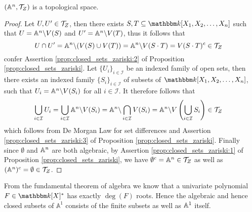 \begin{corollary}
  $(\mathbb{A}^{n}, \mathcal{T}_Z)$ is a topological space.
\end{corollary}
\begin{proof}
  Let $U, U' \in \mathcal{T}_Z$, then there exists $S, T \subseteq \pols$ such that $U = \mathbb{A}^{n} \backslash V(S)$ and $U' = \mathbb{A}^n \backslash V(T)$, thus it follows that
  \begin{equation*}
    U \cap U' = \mathbb{A}^{n} \backslash (V(S) \cup V(T)) = \mathbb{A}^{n} \backslash V(S \cdot T) = V(S \cdot T)^{c} \in \mathcal{T}_Z
  \end{equation*}
  confer Assertion \ref{prop:closed_sets_zariski:2} of Proposition \ref{prop:closed_sets_zariski}. Let $\{U_{i}\}_{i \in \mathcal{I}}$ be an indexed family of open sets, then there exists an indexed family $\{S_{i}\}_{i \in \mathcal{I}}$ of subsets of $\K[X_1, X_2, \ldots, X_{n}]$, such that $U_{i} = \mathbb{A}^{n} \backslash V(S_{i})$ for all $i \in \mathcal{I}$. It therefore follows that
  \begin{equation*}
    \bigcup_{i \in \mathcal{I}} U_{i} = \bigcup_{i \in \mathcal{I}} \mathbb{A}^{n} \backslash V(S_{i}) = \mathbb{A}^{n} \backslash \bigcap_{i \in \mathcal{I}} V(S_{i}) = \mathbb{A}^{n} \backslash V\left(\bigcup_{i \in \mathcal{I}} S_{i}\right) \in \mathcal{T}_Z
  \end{equation*}
  which follows from De Morgan Law for set differences and Assertion \ref{prop:closed_sets_zariski:3} of Proposition \ref{prop:closed_sets_zariski}. Finally since $\emptyset$ and $\mathbb{A}^{n}$ are both algebraic, by Assertion  \ref{prop:closed_sets_zariski:1} of Proposition \ref{prop:closed_sets_zariski}, we have $\emptyset^{c} = \mathbb{A}^{n} \in \mathcal{T}_Z$ as well as $(\mathbb{A}^{n})^{c} = \emptyset \in \mathcal{T}_Z$.
\end{proof}

\begin{example}\label{exmp:closed_sets_of_A1}
  From the fundamental theorem of algebra we know that a univariate polynomial $F \in \K[X]^{*}$ has exactly $\deg(F)$ roots. Hence the algebraic and hence closed subsets of $\mathbb{A}^{1}$ consists of the finite subsets as well as $\mathbb{A}^{1}$ itself.
\end{example}
